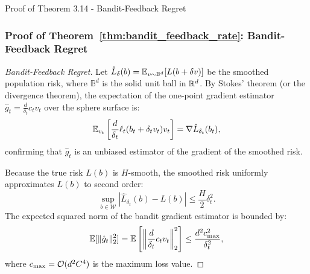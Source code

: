 \begin{sourceblock}{Proof of Theorem 3.14 - Bandit-Feedback Regret}
\subsubsection*{Proof of Theorem~\ref{thm:bandit_feedback_rate}: Bandit-Feedback Regret}
\label{app:proof_bandit_feedback_rate}
\begin{proof}[Bandit-Feedback Regret]
Let $\hat{L}_{\delta}(b) = \mathbb{E}_{v \sim \mathbb{B}^d}[L(b + \delta v)]$ be the smoothed population risk, where $\mathbb{B}^d$ is the solid unit ball in $\mathbb{R}^d$. By Stokes' theorem (or the divergence theorem), the expectation of the one-point gradient estimator $\hat{g}_t = \frac{d}{\delta_t} c_t v_t$ over the sphere surface is:
\begin{equation}
    \mathbb{E}_{v_t}\left[ \frac{d}{\delta_t} \ell_t(b_t + \delta_t v_t) v_t \right] = \nabla \hat{L}_{\delta_t}(b_t),
\end{equation}
confirming that $\hat{g}_t$ is an unbiased estimator of the gradient of the smoothed risk.

Because the true risk $L(b)$ is $H$-smooth, the smoothed risk uniformly approximates $L(b)$ to second order:
\begin{equation}
    \sup_{b \in \mathcal{W}} |\hat{L}_{\delta_t}(b) - L(b)| \le \frac{H}{2} \delta_t^2.
\end{equation}
The expected squared norm of the bandit gradient estimator is bounded by:
\begin{equation}
    \mathbb{E}[\|\hat{g}_t\|_2^2] = \mathbb{E}\left[ \left\| \frac{d}{\delta_t} c_t v_t \right\|_2^2 \right] \le \frac{d^2 c_{\max}^2}{\delta_t^2},
\end{equation}
where $c_{\max} = \mathcal{O}(d^2 C^4)$ is the maximum loss value.


\end{proof}
\end{sourceblock}
